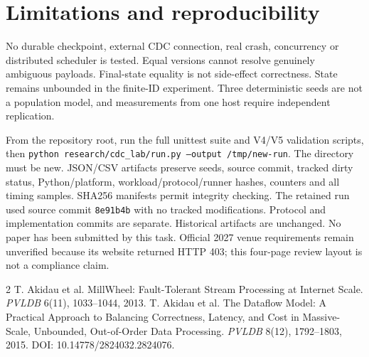 \documentclass[10pt,twocolumn]{article}
\begin{document}
\section{Limitations and reproducibility}
No durable checkpoint, external CDC connection, real crash, concurrency or distributed
scheduler is tested. Equal versions cannot resolve genuinely ambiguous payloads.
Final-state equality is not side-effect correctness. State remains unbounded in the
finite-ID experiment. Three deterministic seeds are not a population model, and
measurements from one host require independent replication.

From the repository root, run the full unittest suite and V4/V5 validation scripts,
then \texttt{python research/cdc\_lab/run.py --output /tmp/new-run}. The directory
must be new. JSON/CSV artifacts preserve seeds, source commit, tracked dirty status,
Python/platform, workload/protocol/runner hashes, counters and all timing samples.
SHA256 manifests permit integrity checking. The retained run used source commit
\texttt{8e91b4b} with no tracked modifications. Protocol and implementation commits
are separate. Historical artifacts are unchanged. No paper has been submitted by
this task. Official 2027 venue requirements remain unverified because its website
returned HTTP 403; this four-page review layout is not a compliance claim.

\begin{thebibliography}{2}
 T. Akidau et al. MillWheel: Fault-Tolerant Stream Processing at
Internet Scale. \emph{PVLDB} 6(11), 1033--1044, 2013.
 T. Akidau et al. The Dataflow Model: A Practical Approach to
Balancing Correctness, Latency, and Cost in Massive-Scale, Unbounded, Out-of-Order
Data Processing. \emph{PVLDB} 8(12), 1792--1803, 2015.
DOI: 10.14778/2824032.2824076.
\end{thebibliography}
\end{document}
